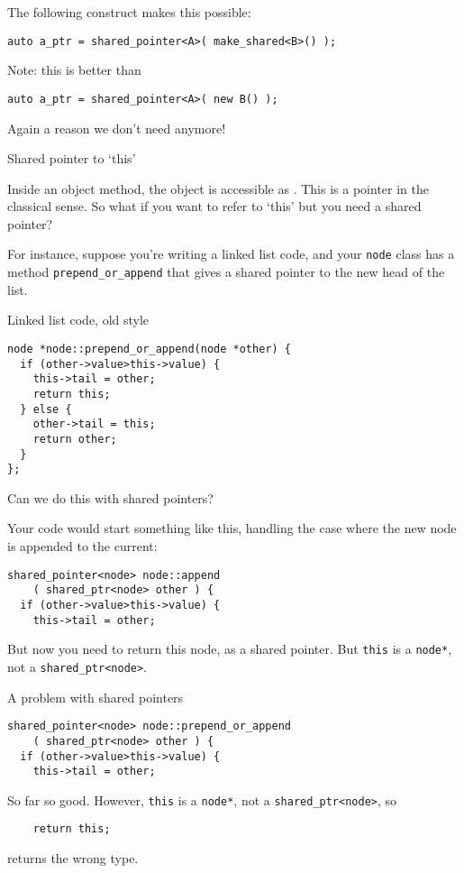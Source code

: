 The following construct makes this possible:
\begin{lstlisting}
auto a_ptr = shared_pointer<A>( make_shared<B>() );
\end{lstlisting}

Note: this is better than
\begin{lstlisting}
auto a_ptr = shared_pointer<A>( new B() );
\end{lstlisting}
Again a reason we don't need  anymore!

 {Shared pointer to `this'}

Inside an object method, the object is accessible as
. This is a pointer in the classical sense. So what
if you want to refer to `this' but you need a shared pointer?

For instance, suppose you're writing a linked list code, and your
\lstinline{node} class has a method \lstinline{prepend_or_append} that gives a shared
pointer to the new head of the list.

\begin{slide}{Linked list code, old style}
  \label{sl:share-ptr-node}  
\begin{lstlisting}
node *node::prepend_or_append(node *other) {
  if (other->value>this->value) {
    this->tail = other;
    return this;
  } else {
    other->tail = this;
    return other;
  }
};
\end{lstlisting}
Can we do this with shared pointers?
\end{slide}

Your code would start something
like this, handling the case where the new node is appended to the current:
\begin{lstlisting}
shared_pointer<node> node::append
    ( shared_ptr<node> other ) {
  if (other->value>this->value) {
    this->tail = other;
\end{lstlisting}
But now you need to return this node, as a shared pointer. But
\lstinline{this} is a \lstinline{node*}, not a \lstinline{shared_ptr<node>}.

\begin{slide}{A problem with shared pointers}
  \label{sl:share-ptr-node-sh}
\begin{lstlisting}
shared_pointer<node> node::prepend_or_append
    ( shared_ptr<node> other ) {
  if (other->value>this->value) {
    this->tail = other;
\end{lstlisting}
So far so good. However, \lstinline{this} is a \lstinline{node*}, not a
\lstinline{shared_ptr<node>}, so
\begin{lstlisting}
    return this;
\end{lstlisting}
returns the wrong type.
\end{slide}

